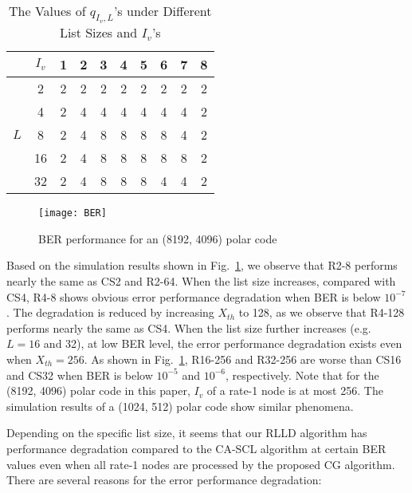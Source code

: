 \documentclass[journal]{IEEEtran}
\begin{document}
\begin{table}[hbt]
  \centering
  \caption{The Values of $q_{I_v, L}$'s under Different List Sizes and $I_v$'s}
  \label{tab: m_i}
  \footnotesize
  \begin{tabular}{c|c||c|c|c|c|c|c|c|c}
    \hline
   & $I_v$& 1 & 2 & 3 & 4 & 5 & 6 & 7& 8 \\ \hline\hline
   \multirow{5}{*}{$L$}& 2   & 2         & 2        & 2        & 2         & 2         & 2        &  2       & 2 \\
       &4& 2         & 4        & 4        & 4        & 4         & 4        &  4       & 2 \\
      &8 & 2         &4         & 8        &8         &8          &8         & 4        & 2 \\
      &16 & 2         &4         & 8        &8         &8          &8         & 8        & 2 \\
      & 32& 2         &4         & 8        &8         &8          &4         & 4        & 2 \\ \hline
  \end{tabular}
\end{table}

\begin{figure} [hbt]
\centering
\texttt{[image: BER]}
  \caption{BER performance for an (8192, 4096) polar code}\label{fig: ber8192}
\end{figure}


Based on the simulation results shown in Fig.~\ref{fig: ber8192}, we observe that R2-8 performs nearly the same as CS2 and R2-64. When the list size increases, compared with CS4, R4-8 shows obvious error performance degradation when BER is below $10^{-7}$. The degradation is reduced by increasing $X_{th}$ to 128, as we observe that R4-128 performs nearly the same as CS4. When the list size further increases (e.g. $L=16$ and 32), at low BER level, the error performance degradation exists even when $X_{th} =256$. As shown in Fig.~\ref{fig: ber8192}, R16-256 and R32-256 are worse than CS16 and CS32 when BER is below $10^{-5}$ and $10^{-6}$, respectively. Note that for the (8192, 4096) polar code in this paper, $I_v$ of a rate-1 node is at most 256. The simulation results of a (1024, 512) polar code show similar phenomena.

Depending on the specific list size, it seems that our RLLD algorithm has performance degradation compared to the CA-SCL algorithm at certain BER values even when all rate-1 nodes are processed by the proposed CG algorithm.
There are several reasons for the error performance degradation:
\end{document}
